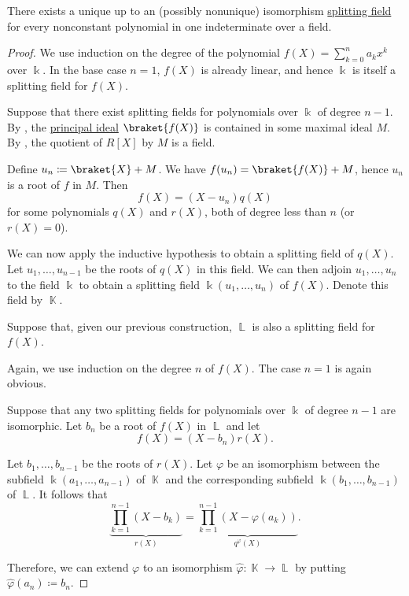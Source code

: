 \begin{proposition}\label{thm:splitting_field_existence}
  There exists a unique up to an (possibly nonunique) isomorphism \hyperref[def:splitting_field]{splitting field} for every nonconstant polynomial in one indeterminate over a field.
\end{proposition}
\begin{proof}
  \ExistenceSubProof{} We use induction on the degree of the polynomial \( f(X) = \sum_{k=0}^n a_k x^k \) over \( \Bbbk \). In the base case \( n = 1 \), \( f(X) \) is already linear, and hence \( \Bbbk \) is itself a splitting field for \( f(X) \).

  Suppose that there exist splitting fields for polynomials over \( \Bbbk \) of degree \( n - 1 \). By , the \hyperref[def:semiring_ideal]{principal ideal} \( \braket{ f(X) } \) is contained in some maximal ideal \( M \). By , the quotient of \( R[X] \) by \( M \) is a field.

  Define \( u_n \coloneqq \braket{ X } + M \). We have \( f(u_n) = \braket{ f(X) } + M \), hence \( u_n \) is a root of \( f \) in \( M \). Then
  \begin{equation*}
    f(X) = (X - u_n) q(X)
  \end{equation*}
  for some polynomials \( q(X) \) and \( r(X) \), both of degree less than \( n \) (or \( r(X) = 0 \)).

  We can now apply the inductive hypothesis to obtain a splitting field of \( q(X) \). Let \( u_1, \ldots, u_{n-1} \) be the roots of \( q(X) \) in this field. We can then adjoin \( u_1, \ldots, u_n \) to the field \( \Bbbk \) to obtain a splitting field \( \Bbbk(u_1, \ldots, u_n) \) of \( f(X) \). Denote this field by \( \BbbK \).

  \UniquenessSubProof Suppose that, given our previous construction, \( \BbbL \) is also a splitting field for \( f(X) \).

  Again, we use induction on the degree \( n \) of \( f(X) \). The case \( n = 1 \) is again obvious.

  Suppose that any two splitting fields for polynomials over \( \Bbbk \) of degree \( n - 1 \) are isomorphic. Let \( b_n \) be a root of \( f(X) \) in \( \BbbL \) and let
  \begin{equation*}
    f(X) = (X - b_n) r(X).
  \end{equation*}

  Let \( b_1, \ldots, b_{n-1} \) be the roots of \( r(X) \). Let \( \varphi \) be an isomorphism between the subfield \( \Bbbk(a_1, \ldots, a_{n-1}) \) of \( \BbbK \) and the corresponding subfield \( \Bbbk(b_1, \ldots, b_{n-1}) \) of \( \BbbL \). It follows that
  \begin{equation*}
    \underbrace{\prod_{k=1}^{n-1} (X - b_k)}_{r(X)} = \underbrace{\prod_{k=1}^{n-1} (X - \varphi(a_k))}_{q^\varphi(X)}.
  \end{equation*}

  Therefore, we can extend \( \varphi \) to an isomorphism \( \widehat{\varphi}: \BbbK \to \BbbL \) by putting \( \widehat{\varphi}(a_n) \coloneqq b_n \).
\end{proof}

